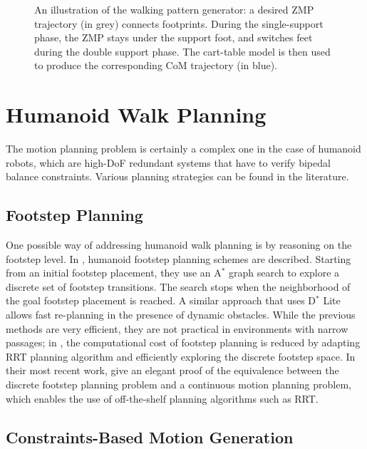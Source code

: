 \begin{figure}
  \centering
  
  \caption{An illustration of the walking pattern generator: a desired
    ZMP trajectory (in grey) connects footprints. During the
    single-support phase, the ZMP stays under the support foot, and
    switches feet during the double support phase. The cart-table
    model is then used to produce the corresponding CoM trajectory (in
    blue).}
  \label{fig:chap1-zmp}
\end{figure}

\section{Humanoid Walk Planning}
\label{sec:chap1-humanoid-walk-planning}

The motion planning problem is certainly a complex one in the case of
humanoid robots, which are high-DoF redundant systems that have to
verify bipedal balance constraints. Various planning strategies can
be found in the literature.

\subsection{Footstep Planning}
\label{subsec:chap1-footstep-planning}

One possible way of addressing humanoid walk planning is by reasoning
on the footstep level. In \cite{kuff01,ches05}, humanoid footstep
planning schemes are described. Starting from an initial footstep
placement, they use an A$^{*}$ graph search \cite{hart68} to explore a
discrete set of footstep transitions. The search stops when the
neighborhood of the goal footstep placement is reached. A similar
approach \cite{garimort2011humanoid} that uses D$^*$ Lite allows fast
re-planning in the presence of dynamic obstacles. While the previous
methods are very efficient, they are not practical in environments
with narrow passages; in \cite{xia09, perr11a}, the computational cost
of footstep planning is reduced by adapting RRT planning algorithm and
efficiently exploring the discrete footstep space. In their most
recent work, \cite{perr11b, perr12} give an elegant proof of the
equivalence between the discrete footstep planning problem and a
continuous motion planning problem, which enables the use of
off-the-shelf planning algorithms such as RRT.

\subsection{Constraints-Based Motion Generation}
\label{subsec:chap1-constraints-motion-generation}

